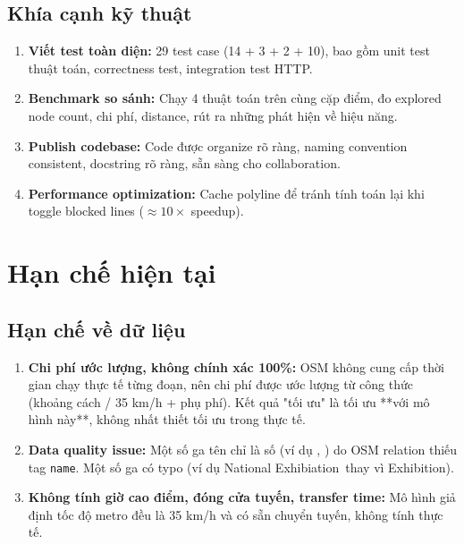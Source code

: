 \subsection{Khía cạnh kỹ thuật}

\begin{enumerate}
  \item \textbf{Viết test toàn diện:} 29 test case (14 + 3 + 2 + 10), bao gồm unit test thuật toán, correctness test, integration test HTTP.

  \item \textbf{Benchmark so sánh:} Chạy 4 thuật toán trên cùng cặp điểm, đo explored node count, chi phí, distance, rút ra những phát hiện về hiệu năng.

  \item \textbf{Publish codebase:} Code được organize rõ ràng, naming convention consistent, docstring rõ ràng, sẵn sàng cho collaboration.

  \item \textbf{Performance optimization:} Cache polyline để tránh tính toán lại khi toggle blocked lines ($\approx 10 \times$ speedup).
\end{enumerate}

\section{Hạn chế hiện tại}

\subsection{Hạn chế về dữ liệu}

\begin{enumerate}
  \item \textbf{Chi phí ước lượng, không chính xác 100\%:} OSM không cung cấp thời gian chạy thực tế từng đoạn, nên chi phí được ước lượng từ công thức (khoảng cách / 35 km/h + phụ phí). Kết quả "tối ưu" là tối ưu **với mô hình này**, không nhất thiết tối ưu trong thực tế.

  \item \textbf{Data quality issue:} Một số ga tên chỉ là số (ví dụ \textquotedbl, \textquotedbl) do OSM relation thiếu tag \texttt{name}. Một số ga có typo (ví dụ \textquotedbl National Exhibiation\textquotedbl\ thay vì \textquotedbl Exhibition\textquotedbl).

  \item \textbf{Không tính giờ cao điểm, đóng cửa tuyến, transfer time:} Mô hình giả định tốc độ metro đều là 35 km/h và có sẵn chuyển tuyến, không tính thực tế.
\end{enumerate}

